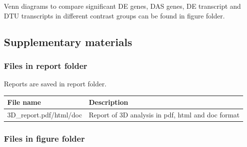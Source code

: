 \documentclass[]{article}
\begin{document}
Venn diagrams to compare significant DE genes, DAS genes, DE transcript
and DTU transcripts in different contrast groups can be found in figure
folder.

\subsection{Supplementary materials}\label{supplementary-materials}

\subsubsection{Files in report folder}\label{files-in-report-folder}

Reports are saved in report folder.

\begin{longtable}[]{@{}ll@{}}
\toprule
File name & Description\tabularnewline
\midrule
\endhead
3D\_report.pdf/html/doc & Report of 3D analysis in pdf, html and doc
format\tabularnewline
\bottomrule
\end{longtable}

\subsubsection{Files in figure folder}\label{files-in-figure-folder}
\end{document}

